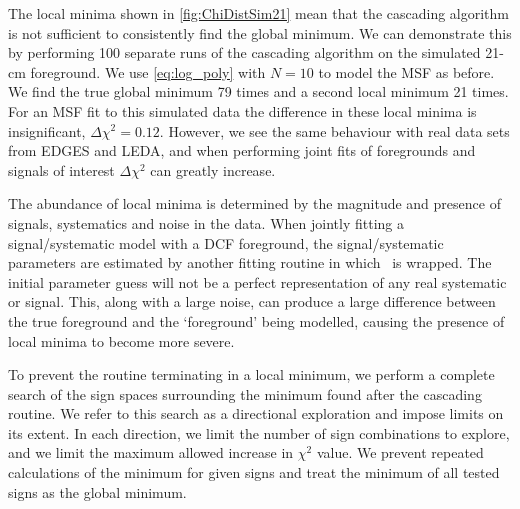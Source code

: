 The local minima shown in \cref{fig:ChiDistSim21} mean that the cascading algorithm is not sufficient to consistently find the global minimum. We can demonstrate this by performing 100 separate runs of the cascading algorithm on the simulated 21-cm foreground. We use \cref{eq:log_poly} with $N = 10$ to model the MSF as before. We find the true global minimum 79 times and a second local minimum 21 times. For an MSF fit to this simulated data the difference in these local minima is insignificant, $\Delta \chi^2 = 0.12$. However, we see the same behaviour with real data sets from EDGES and LEDA, and when performing joint fits of foregrounds and signals of interest $\Delta \chi^2$ can greatly increase.

The abundance of local minima is determined by the magnitude and presence of signals, systematics and noise in the data. When jointly fitting a signal/systematic model with a DCF foreground, the signal/systematic parameters are estimated by another fitting routine in which \maxsmooth~is wrapped. The initial parameter guess will not be a perfect representation of any real systematic or signal. This, along with a large noise, can produce a large difference between the true foreground and the `foreground' being modelled, causing the presence of local minima to become more severe.

To prevent the routine terminating in a local minimum, we perform a complete search of the sign spaces surrounding the minimum found after the cascading routine. We refer to this search as a directional exploration and impose limits on its extent. In each direction, we limit the number of sign combinations to explore, and we limit the maximum allowed increase in $\chi^2$ value. We prevent repeated calculations of the minimum for given signs and treat the minimum of all tested signs as the global minimum.

